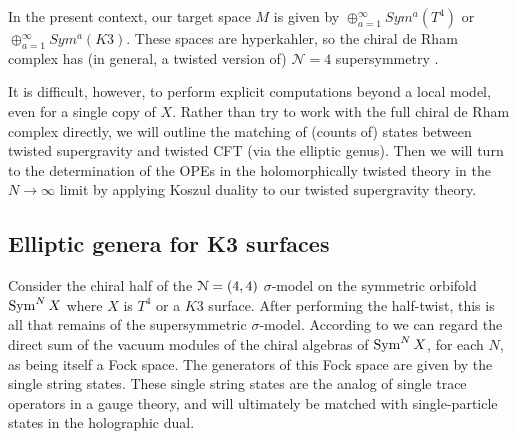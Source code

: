 \documentclass[../main.tex]{subfiles}
\begin{document}
In the present context, our target space $M$ is given by $\oplus_{a=1}^{\infty} Sym^a (T^4)$ or $\oplus_{a=1}^{\infty} Sym^a(K3)$. These spaces are hyperkahler, so the chiral de Rham complex has  (in general, a twisted version of) $\mathcal{N}=4$ supersymmetry \cite{Heluanietal}.

It is difficult, however, to perform explicit computations beyond a local model, even for a single copy of $X$. Rather than try to work with the full chiral de Rham complex directly, we will outline the matching of (counts of) states between twisted supergravity and twisted CFT (via the elliptic genus). Then we will turn to the determination of the OPEs in the holomorphically twisted theory in the $N \rightarrow \infty$ limit by applying Koszul duality to our twisted supergravity theory. 

%


\subsection{Elliptic genera for K3 surfaces}

Consider the chiral half of the $\mathcal N= (4,4)$ $\sigma$-model on the symmetric orbifold  $\operatorname{Sym}^N X$ where $X$ is $T^4$ or a $K3$ surface. 
After performing the half-twist, this is all that remains of the supersymmetric $\sigma$-model.
 According to \cite{DMVV} we can regard the direct sum of the vacuum modules of the chiral algebras of $\operatorname{Sym}^N X$, for each $N$, as being itself a Fock space. The generators of this Fock space are given by the single string states. These single string states are the analog of single trace operators in a gauge theory, and will ultimately be matched with single-particle states in the holographic dual.
\end{document}
